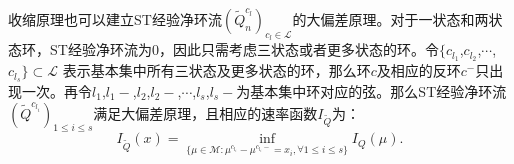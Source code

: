 收缩原理也可以建立ST经验净环流$(\tilde{Q}^{c_l}_n)_{c_l\in\mathcal{L}}$的大偏差原理。对于一状态和两状态环，ST经验净环流为0，因此只需考虑三状态或者更多状态的环。令$\{c_{l_1}$,$c_{l_2}$,$\cdots$,$c_{l_s}\} \subset \mathcal{L}$ 表示基本集中所有三状态及更多状态的环，那么环$c$及相应的反环$c^-$只出现一次。再令$l_1$,$l_1-$,$l_2$,$l_2-$,$\cdots$,$l_s$,$l_s-$为基本集中环对应的弦。那么ST经验净环流$(\tilde{Q}^{c_{l_i}})_{1\le i\le s}$满足大偏差原理，且相应的速率函数$I_{\tilde{Q}}$为：
\begin{equation}\label{I_Q2}
	I_{\tilde{Q}}(x)=\inf_{\{\mu\in\mathcal{M}:\mu^{c_{l_{i}}}-\mu^{c_{l_{i}}-}= x_i,\forall 1\le i\le s\}}I_Q(\mu).
\end{equation}